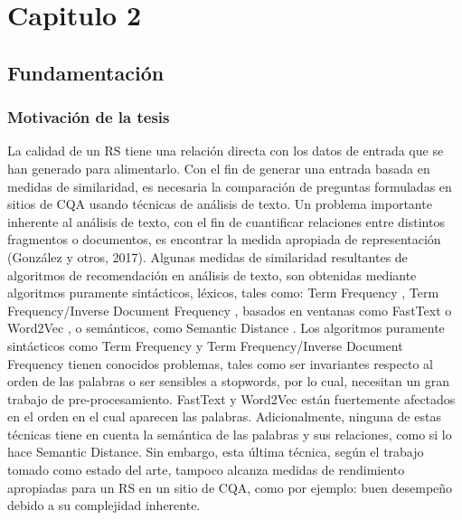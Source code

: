 \chapter*{Capitulo 2}\label{ch:plan}
\section{Fundamentación}
\subsection{Motivación de la tesis}
\noindent La calidad de un RS tiene una relación directa con los datos de entrada que se han generado para alimentarlo. Con el fin de generar una entrada basada en medidas de similaridad, es necesaria la comparación de preguntas formuladas en sitios de CQA usando técnicas de análisis de texto. Un problema importante inherente al análisis de texto, con el fin de cuantificar relaciones entre distintos fragmentos o documentos, es encontrar la medida apropiada de representación (González y otros, 2017). Algunas medidas de similaridad resultantes de algoritmos de recomendación en análisis de texto, son obtenidas mediante algoritmos puramente sintácticos, léxicos, tales como: Term Frequency \citep{salton5mcgill}, Term Frequency/Inverse Document Frequency \citep{baeza1999modern}, basados en ventanas como FastText \citep{joulin2016fasttext} o Word2Vec \citep{mikolov2013efficient}, o semánticos, como Semantic Distance \citep{li2006sentence}. Los algoritmos puramente sintácticos como Term Frequency y Term Frequency/Inverse Document Frequency tienen conocidos problemas, tales como ser invariantes respecto al orden de las palabras o ser sensibles a stopwords, por lo cual, necesitan un gran trabajo de pre-procesamiento. FastText y Word2Vec están fuertemente afectados en el orden en el cual aparecen las palabras. Adicionalmente, ninguna de estas técnicas tiene en cuenta la semántica de las palabras y sus relaciones, como si lo hace Semantic Distance. Sin embargo, esta última técnica, según el trabajo tomado como estado del arte, tampoco alcanza medidas de rendimiento apropiadas para un RS en un sitio de CQA, como por ejemplo: buen desempeño debido a su complejidad inherente.

